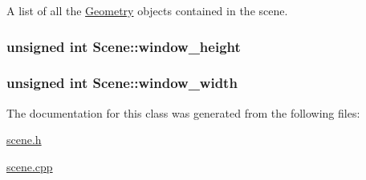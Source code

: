 A list of all the \hyperlink{class_geometry}{Geometry} objects contained in the scene. 

\hypertarget{class_scene_a3ed2bc793472186b711ade7e851ad7d4}{
\subsubsection[{window\+\_\+height}]{\setlength{\rightskip}{0pt plus 5cm}unsigned int Scene\+::window\+\_\+height}}\label{class_scene_a3ed2bc793472186b711ade7e851ad7d4}
\hypertarget{class_scene_a08bdf1d4c4029eeb14fe0ac8db9026e5}{
\subsubsection[{window\+\_\+width}]{\setlength{\rightskip}{0pt plus 5cm}unsigned int Scene\+::window\+\_\+width}}\label{class_scene_a08bdf1d4c4029eeb14fe0ac8db9026e5}


The documentation for this class was generated from the following files\+:\begin{DoxyCompactItemize}
\item 
\hyperlink{scene_8h}{scene.\+h}\item 
\hyperlink{scene_8cpp}{scene.\+cpp}\end{DoxyCompactItemize}
